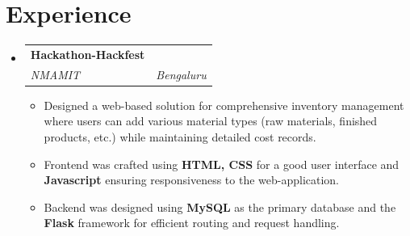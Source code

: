 \documentclass[letterpaper,11pt]{article}
\makeatletter
\newcommand{\resumeItem}[1]{
  \item\small{
    {#1 \vspace{-2pt}}
  }
}
\newcommand{\resumeSubheading}[4]{
  \vspace{-2pt}\item
    \begin{tabular*}{0.97\textwidth}[t]{l@{\extracolsep{\fill}}r}
      \textbf{#1} & #2 \\
      \textit{\small#3} & \textit{\small #4} \\
    \end{tabular*}\vspace{-7pt}
}
\newcommand{\resumeSubSubheading}[2]{
    \item
    \begin{tabular*}{0.97\textwidth}{l@{\extracolsep{\fill}}r}
      \textit{\small#1} & \textit{\small #2} \\
    \end{tabular*}\vspace{-7pt}
}
\newcommand{\resumeSubHeadingListStart}{\begin{itemize}[leftmargin=0.15in, label={}]}
\newcommand{\resumeSubHeadingListEnd}{\end{itemize}}
\newcommand{\resumeItemListStart}{\begin{itemize}}
\newcommand{\resumeItemListEnd}{\end{itemize}\vspace{-5pt}}
\makeatother
\begin{document}
\section{Experience}
  \resumeSubHeadingListStart

    \resumeSubheading
      {Hackathon-Hackfest}{}
      {NMAMIT}{Bengaluru}
      \resumeItemListStart
        \resumeItem{Designed a web-based solution for comprehensive inventory management where users can add various material types (raw materials, finished products, etc.) while maintaining detailed cost records.}
        \resumeItem{Frontend was crafted using \textbf{HTML, CSS} for a good user interface and \textbf{Javascript} ensuring responsiveness to the web-application.} 
        \resumeItem{Backend was designed using  \textbf{MySQL} as the primary database and the \textbf{Flask} framework for efficient routing and request handling.}
        \resumeItemListEnd
      

    

  \resumeSubHeadingListEnd


\end{document}
